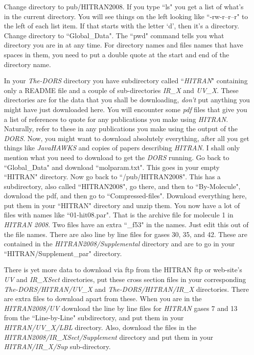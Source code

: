 \documentclass[12pt]{article}
\begin{document}
Change directory to pub/HITRAN2008. If you type ``ls" you get a list of what's in the
current directory.  You will see things on the left looking like ``-rw-r--r--r" to the left of each list
item. If that starts with the letter `d', then it's a directory. Change directory to
``Global\_Data".
The ``pwd" command tells you what directory you are in at any time.
 For directory names and files names that have spaces in them, you need to put a double quote at the start and end of
the directory name. 

In your {\it The-DORS} directory you have subdirectory called ``{\it HITRAN}" containing only a README file
and a couple of sub-directories {\it IR\_X} and {\it UV\_X}.
 These directories are for the data that you shall be downloading, {\it don't} put 
 anything you might have  just downloaded here. You will encounter  some {\it pdf} files that
 give you a list of references to quote
for any publications you make using {\it HITRAN}. Naturally, refer to these in any  publications you make
using the output of the {\it DORS}. Now, you might want to download absolutely everything, after all you get
things like {\it JavaHAWKS} and copies of papers describing {\it HITRAN}. I shall only mention what you need
to download to get the {\it DORS} running. Go back to ``Global\_Data" and download ``molparam.txt".
This goes in your empty ``HITRAN" directory.  Now go back to ``/pub/HITRAN2008". This has a subdirectory,
also called ``HITRAN2008", go there, and then to ``By-Molecule", download the pdf, and then
go to ``Compressed-files". Download everything here, put them in your ``HITRAN" directory and
unzip them. You now have a lot of files with names like ``01-hit08.par". That is the archive file
for molecule 1 in {\it HITRAN 2008}. Two files have an extra ``\_f53"
in the names. Just edit this out of the file names. There are also  line by line files
 for gases 30, 35, and 42. These are contained in the {\it HITRAN2008/Supplemental} directory
and are to go in your ``HITRAN/Supplement\_par" directory.

There is yet more data to download
 via ftp from the {HITRAN} ftp or web-site's  {\it UV} and {\it IR\_XSect} directories, put these
 cross section files in your corresponding {\it The-DORS/HITRAN/UV\_X} and {\it The-DORS/HITRAN/IR\_X} directories. 
There are extra files to download apart from these.
When you are in the {\it HITRAN2008/UV} download the line by line files for {\it HITRAN} gases 7 and 13
from the ``Line-by-Line" subdirectory,
 and put them in your {\it HITRAN/UV\_X/LBL} directory. Also, download the files in the 
{\it HITRAN2008/IR\_XSect/Supplement} directory and put them in your {\it HITRAN/IR\_X/Sup} sub-directory.
\end{document}
